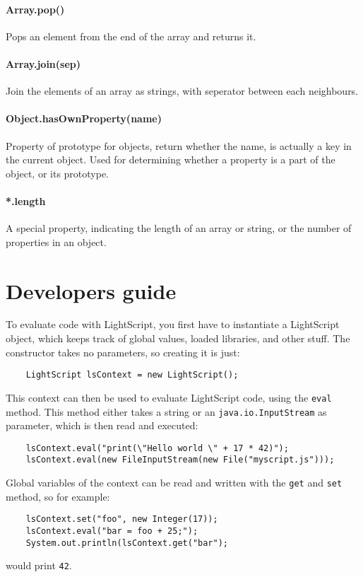 \documentclass[11pt]{report}
\begin{document}
\paragraph{Array.pop()} Pops an element from the end of the array and returns it.
\paragraph{Array.join(sep)} Join the elements of an array as strings, with seperator between each neighbours.
\paragraph{Object.hasOwnProperty(name)} Property of prototype for objects, return whether the name, is actually a key in the current object. Used for determining whether a property is a part of the object, or its prototype.
\paragraph{*.length} A special property, indicating the length of an array or string, or the number of properties in an object.





\section{Developers guide}
To evaluate code with LightScript, you first have to instantiate a LightScript object, which keeps track of global values, loaded libraries, and other stuff. The constructor takes no parameters, so creating it is just:
\begin{lstlisting}
    LightScript lsContext = new LightScript();
\end{lstlisting}
This context can then be used to evaluate LightScript code, using the \verb|eval| method. This method either takes a string or an \verb|java.io.InputStream| as parameter, which is then read and executed:
\begin{lstlisting}
    lsContext.eval("print(\"Hello world \" + 17 * 42)");
    lsContext.eval(new FileInputStream(new File("myscript.js")));
\end{lstlisting}
Global variables of the context can be read and written with the \verb|get| and \verb|set| method, so for example:
\begin{lstlisting}
    lsContext.set("foo", new Integer(17));
    lsContext.eval("bar = foo + 25;");
    System.out.println(lsContext.get("bar");
\end{lstlisting}
would print \verb|42|.
\end{document}
